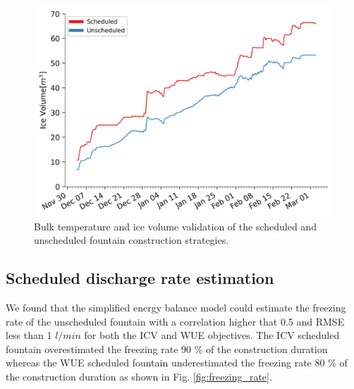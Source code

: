 \documentclass[tc, manuscript]{copernicus}
\begin{document}
\begin{figure}[t] 
  \includegraphics[width=12cm]{Figures/validation.png} 
  \caption{Bulk temperature and ice volume validation of the scheduled and unscheduled fountain construction strategies.} 
\label{fig:validation} 
\end{figure}

\subsection{Scheduled discharge rate estimation}

We found that the simplified energy balance model could estimate the freezing rate of the unscheduled fountain
with a correlation higher that 0.5 and RMSE less than 1 $l/min$ for both the ICV and WUE objectives. The
ICV scheduled fountain overestimated the freezing rate 90 \% of the construction duration whereas the WUE
scheduled fountain underestimated the freezing rate 80 \% of the construction duration as shown in Fig.
\ref{fig:freezing_rate}.
\end{document}
